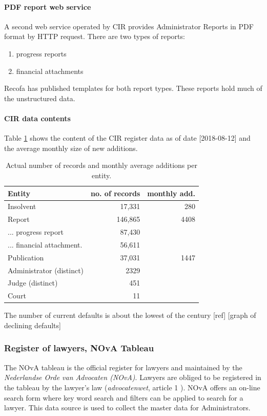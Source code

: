 \paragraph{PDF report web service}
A second web service operated by CIR provides Administrator Reports in PDF format by HTTP request. There are two types of reports: 
\begin{enumerate}
\item progress reports
\item financial attachments
\end{enumerate}
Recofa has published templates for both report types\cite{rechtspraak:3}. These reports hold much of the unstructured data.

\paragraph{CIR data contents}
Table \ref{table:cir_contents} shows the content of the CIR register data as of date [2018-08-12] and the average monthly size of new additions.

\begin{table}[h]
\caption{Actual number of records and monthly average additions per entity.}
\centering
\begin{tabular}{l r r}
\hline\hline
Entity & no. of records & monthly add.\\
\hline
Insolvent & 17,331 & 280 \\
Report & 146,865 & 4408 \\
... progress report & 87,430 &  \\
... financial attachment. & 56,611 &  \\
Publication & 37,031 & 1447 \\
Administrator (distinct) & 2329 & \\
Judge (distinct) & 451 & \\
Court & 11 & \\
\hline
\end{tabular}
\label{table:cir_contents}
\end{table}

The number of current defaults is about the lowest of the century [ref] [graph of declining defaults]

\subsubsection{Register of lawyers, NOvA Tableau}\label{NOvA Tableau}

The NOvA tableau is the official register for lawyers and maintained by the \textit{Nederlandse Orde van Advocaten (NOvA)}\cite{nova:1}. Lawyers are obliged to be registered in the tableau by the lawyer's law (\textit{advocatenwet}, article 1 \cite{law:2}). NOvA offers an on-line search form where key word search and filters can be applied to search for a lawyer. This data source is used to collect the master data for Administrators. 

